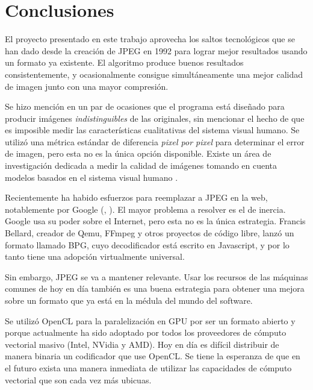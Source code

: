 
\chapter{Conclusiones}\label{ch:conclusiones}

El proyecto presentado en este trabajo aprovecha los saltos tecnológicos que se
han dado desde la creación de JPEG en 1992 \cite{jpeg-spec} para lograr mejor
resultados usando un formato ya existente. El algoritmo produce buenos
resultados consistentemente, y ocasionalmente consigue simultáneamente una
mejor calidad de imagen junto con una mayor compresión.

Se hizo mención en un par de ocasiones que el programa está diseñado para
producir imágenes \emph{indistinguibles} de las originales, sin mencionar el
hecho de que es imposible medir las características cualitativas del sistema
visual humano. Se utilizó una métrica estándar de diferencia \emph{pixel por
pixel} para determinar el error de imagen, pero esta no es la única opción
disponible. Existe un área de investigación dedicada a medir la calidad de
imágenes tomando en cuenta modelos basados en el sistema visual humano
\cite{subjective-paper}.

Recientemente ha habido esfuerzos para reemplazar a JPEG en la web,
notablemente por Google (\cite{brotli}, \cite{webp}). El mayor problema a
resolver es el de inercia. Google usa su poder sobre el Internet, pero esta no
es la única estrategia. Francis Bellard, creador de Qemu, FFmpeg y otros
proyectos de código libre, lanzó un formato llamado \gls{BPG}, cuyo
decodificador está escrito en Javascript, y por lo tanto tiene una adopción
virtualmente universal.

Sin embargo, JPEG se va a mantener relevante. Usar los recursos de las
máquinas comunes de hoy en día también es una buena estrategia para obtener una
mejora sobre un formato que ya está en la médula del mundo del software.

Se utilizó OpenCL para la paralelización en GPU por ser un formato abierto y
porque actualmente ha sido adoptado por todos los proveedores de cómputo
vectorial masivo (Intel, NVidia y AMD). Hoy en día es difícil distribuir de
manera binaria un codificador que use OpenCL. Se tiene la esperanza de que en
el futuro exista una manera inmediata de utilizar las capacidades de cómputo
vectorial que son cada vez más ubicuas.

